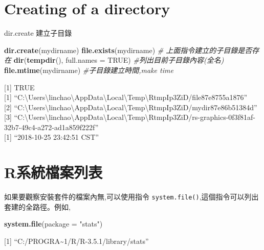 \documentclass[]{book}
\newenvironment{Shaded}{\begin{snugshade}}{\end{snugshade}}
\newcommand{\CommentTok}[1]{\textcolor[rgb]{0.56,0.35,0.01}{\textit{#1}}}
\newcommand{\DataTypeTok}[1]{\textcolor[rgb]{0.13,0.29,0.53}{#1}}
\newcommand{\KeywordTok}[1]{\textcolor[rgb]{0.13,0.29,0.53}{\textbf{#1}}}
\newcommand{\NormalTok}[1]{#1}
\newcommand{\OtherTok}[1]{\textcolor[rgb]{0.56,0.35,0.01}{#1}}
\newcommand{\StringTok}[1]{\textcolor[rgb]{0.31,0.60,0.02}{#1}}
\theoremstyle{definition}
\theoremstyle{definition}
\theoremstyle{definition}
\theoremstyle{remark}
\begin{document}
\hypertarget{creating-of-a-directory}{%
\section{Creating of a directory}\label{creating-of-a-directory}}

dir.create 建立子目錄

\begin{Shaded}
\begin{Highlighting}[]
\KeywordTok{dir.create}\NormalTok{(mydirname)  }
\KeywordTok{file.exists}\NormalTok{(mydirname) }\CommentTok{# 上面指令建立的子目錄是否存在}
\KeywordTok{dir}\NormalTok{(}\KeywordTok{tempdir}\NormalTok{(), }\DataTypeTok{full.names =} \OtherTok{TRUE}\NormalTok{) }\CommentTok{#列出目前子目錄內容(全名)}
\KeywordTok{file.mtime}\NormalTok{(mydirname) }\CommentTok{#子目錄建立時間,make time}
\end{Highlighting}
\end{Shaded}

{[}1{]} TRUE\\
{[}1{]}
``C:\textbackslash{}Users\textbackslash{}linchao\textbackslash{}AppData\textbackslash{}Local\textbackslash{}Temp\textbackslash{}RtmpIp3ZiD/file87e8755a1876''\\
{[}2{]}
``C:\textbackslash{}Users\textbackslash{}linchao\textbackslash{}AppData\textbackslash{}Local\textbackslash{}Temp\textbackslash{}RtmpIp3ZiD/mydir87e86b51384d''\\
{[}3{]}
``C:\textbackslash{}Users\textbackslash{}linchao\textbackslash{}AppData\textbackslash{}Local\textbackslash{}Temp\textbackslash{}RtmpIp3ZiD/rs-graphics-0f3f81af-32b7-49c4-a272-ad1a859f222f''\\
{[}1{]} ``2018-10-25 23:42:51 CST''

\hypertarget{r}{%
\section{R系統檔案列表}\label{r}}

如果要觀察安裝套件的檔案內無,可以使用指令
\texttt{system.file()},這個指令可以列出套建的全路徑。例如,

\begin{Shaded}
\begin{Highlighting}[]
\KeywordTok{system.file}\NormalTok{(}\DataTypeTok{package =} \StringTok{"stats"}\NormalTok{)}
\end{Highlighting}
\end{Shaded}

{[}1{]} ``C:/PROGRA\textasciitilde{}1/R/R-3.5.1/library/stats''
\end{document}
